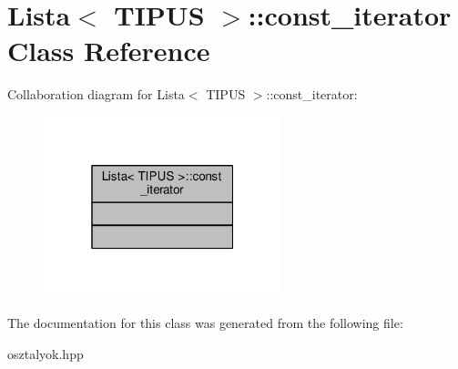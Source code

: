 \hypertarget{class_lista_1_1const__iterator}{}\section{Lista$<$ T\+I\+P\+US $>$\+:\+:const\+\_\+iterator Class Reference}
\label{class_lista_1_1const__iterator}


Collaboration diagram for Lista$<$ T\+I\+P\+US $>$\+:\+:const\+\_\+iterator\+:
\nopagebreak
\begin{figure}[H]
\begin{center}
\leavevmode
\includegraphics[width=196pt]{class_lista_1_1const__iterator__coll__graph}
\end{center}
\end{figure}


The documentation for this class was generated from the following file\+:\begin{DoxyCompactItemize}
\item 
osztalyok.\+hpp\end{DoxyCompactItemize}
